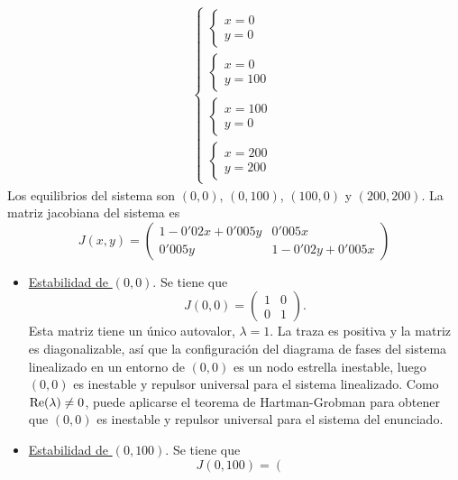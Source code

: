 \documentclass[11pt]{report}
\begin{document}
\begin{solution}
\begin{enumerate}
\begin{align*}
\begin{cases}
\begin{cases}
                    x = 0 \\
                    y = 0
                \end{cases} \\[20pt]
                \begin{cases}
                    x = 0 \\
                    y = 100
                \end{cases} \\[20pt]
                \begin{cases}
                    x = 100 \\
                    y = 0
                \end{cases} \\[20pt]
                \begin{cases}
                    x = 200 \\
                    y = 200
                \end{cases}
            \end{cases}
        \end{align*}
        Los equilibrios del sistema son $(0,0)$, $(0,100)$, $(100,0)$ y $(200,200)$. La matriz jacobiana del sistema es
        \[J(x,y)=\left(\begin{array}{cc}
            1-0'02x+0'005y & 0'005x \\
            0'005y & 1-0'02y+0'005x
        \end{array}\right)\]
        \begin{itemize}
            \item \underline{Estabilidad de $(0,0)$}. Se tiene que
            \[J(0,0)=\left(\begin{array}{cc}
                1 & 0 \\
                0 & 1
            \end{array}\right).\]
            Esta matriz tiene un único autovalor, $\lambda = 1$. La traza es positiva y la matriz es diagonalizable, así que la configuración del diagrama de fases del sistema linealizado en un entorno de $(0,0)$ es un nodo estrella inestable, luego $(0,0)$ es inestable y repulsor universal para el sistema linealizado. Como $\textup{Re}(\lambda) \neq 0$, puede aplicarse el teorema de Hartman-Grobman para obtener que $(0,0)$ es inestable y repulsor universal para el sistema del enunciado.
            \item \underline{Estabilidad de $(0,100)$}. Se tiene que
            \[J(0,100)=\left(\begin{array}{cc}

\end{array}\]
\end{itemize}
\end{enumerate}
\end{solution}
\end{document}
